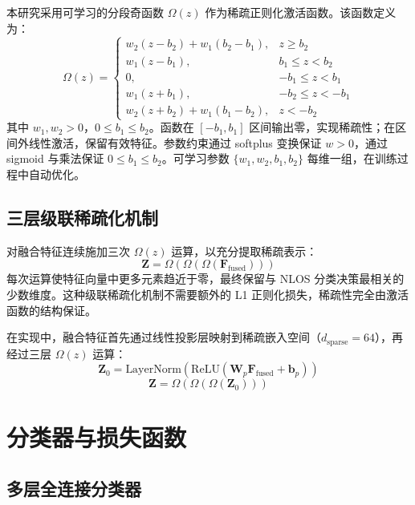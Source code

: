     本研究采用可学习的分段奇函数 $\Omega(z)$ 作为稀疏正则化激活函数。该函数定义为：
    \begin{equation}
    \Omega(z) =
    \begin{cases}
    w_2(z - b_2) + w_1(b_2 - b_1), & z \ge b_2 \\
    w_1(z - b_1),                   & b_1 \le z < b_2 \\
    0,                              & -b_1 \le z < b_1 \\
    w_1(z + b_1),                   & -b_2 \le z < -b_1 \\
    w_2(z + b_2) + w_1(b_1 - b_2),  & z < -b_2
    \end{cases}
    \end{equation}
    其中 $w_1, w_2 > 0$，$0 \le b_1 \le b_2$。函数在 $[-b_1, b_1]$ 区间输出零，实现稀疏性；在区间外线性激活，保留有效特征。参数约束通过 softplus 变换保证 $w > 0$，通过 sigmoid 与乘法保证 $0 \le b_1 \le b_2$。可学习参数 $\{w_1, w_2, b_1, b_2\}$ 每维一组，在训练过程中自动优化。

\subsection{三层级联稀疏化机制}

    对融合特征连续施加三次 $\Omega(z)$ 运算，以充分提取稀疏表示：
    \begin{equation}
    \bm{Z} = \Omega(\Omega(\Omega(\bm{F}_{\text{fused}})))
    \end{equation}
    每次运算使特征向量中更多元素趋近于零，最终保留与 NLOS 分类决策最相关的少数维度。这种级联稀疏化机制不需要额外的 L1 正则化损失，稀疏性完全由激活函数的结构保证。

    在实现中，融合特征首先通过线性投影层映射到稀疏嵌入空间（$d_{\text{sparse}} = 64$），再经过三层 $\Omega(z)$ 运算：
    \begin{equation}
    \bm{Z}_0 = \text{LayerNorm}(\text{ReLU}(\bm{W}_p \bm{F}_{\text{fused}} + \bm{b}_p))
    \end{equation}
    \begin{equation}
    \bm{Z} = \Omega(\Omega(\Omega(\bm{Z}_0)))
    \end{equation}

\section{分类器与损失函数}

\subsection{多层全连接分类器}

